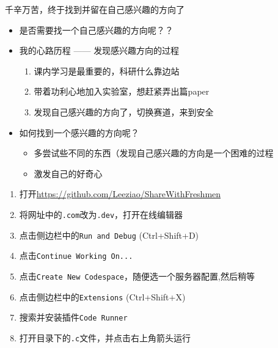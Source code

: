 \documentclass{ctexbeamer} %
\begin{document}
\begin{frame}
	\begin{center}\Large
	千辛万苦，终于找到并留在自己感兴趣的方向了
	\end{center}
\end{frame}

\begin{frame}
	\begin{itemize}
		\item 是否需要找一个自己感兴趣的方向呢？？
		\item 我的心路历程 —— \small{发现感兴趣方向的过程}
		\begin{enumerate}
			\item 课内学习是最重要的，科研什么靠边站
			\item 带着功利心地加入实验室，想赶紧弄出篇paper
			\item 发现自己感兴趣的方向了，切换赛道，来到安全
		\end{enumerate}
		\item 如何找到一个感兴趣的方向呢？
		\begin{itemize}
			\item 多尝试些不同的东西（发现自己感兴趣的方向是一个困难的过程
			\item 激发自己的好奇心
		\end{itemize}
	\end{itemize}
\end{frame}

\begin{frame}[fragile]
	\begin{enumerate}
		\item 打开\url{https://github.com/Leeziao/ShareWithFreshmen}
		\item 将网址中的\texttt{.com}改为\texttt{.dev}，打开在线编辑器
		\item 点击侧边栏中的\texttt{Run and Debug} (Ctrl+Shift+D)
		\item 点击\texttt{Continue Working On...}
		\item 点击\texttt{Create New Codespace}，随便选一个服务器配置,然后稍等
		\item 点击侧边栏中的\texttt{Extensions} (Ctrl+Shift+X)
		\item 搜索并安装插件\texttt{Code Runner}
		\item 打开目录下的\texttt{.c}文件，并点击右上角箭头运行

	\end{enumerate}
\end{frame}
\end{document}
